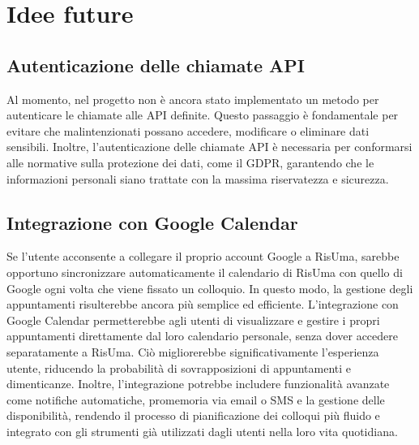 \chapter{Idee future}
\section{Autenticazione delle chiamate API}
Al momento, nel progetto non è ancora stato implementato un metodo per autenticare le chiamate alle API definite. 
Questo passaggio è fondamentale per evitare che malintenzionati possano accedere, modificare 
o eliminare dati sensibili. Inoltre, l'autenticazione delle chiamate API è necessaria per conformarsi alle normative sulla 
protezione dei dati, come il GDPR, garantendo che le informazioni personali siano trattate con la massima riservatezza e sicurezza.
\section{Integrazione con Google Calendar}
Se l'utente acconsente a collegare il proprio account Google a RisUma, sarebbe opportuno sincronizzare automaticamente il calendario 
di RisUma con quello di Google ogni volta che viene fissato un colloquio. In questo modo, la gestione degli appuntamenti risulterebbe 
ancora più semplice ed efficiente. L'integrazione con Google Calendar permetterebbe agli utenti di visualizzare e gestire i propri 
appuntamenti direttamente dal loro calendario personale, senza dover accedere separatamente a RisUma. 
Ciò migliorerebbe significativamente l'esperienza utente, riducendo la probabilità di sovrapposizioni di 
appuntamenti e dimenticanze. Inoltre, l'integrazione potrebbe includere funzionalità avanzate come notifiche automatiche, 
promemoria via email o SMS e la gestione delle disponibilità, rendendo il processo di pianificazione dei colloqui più fluido 
e integrato con gli strumenti già utilizzati dagli utenti nella loro vita quotidiana.
\clearpage
